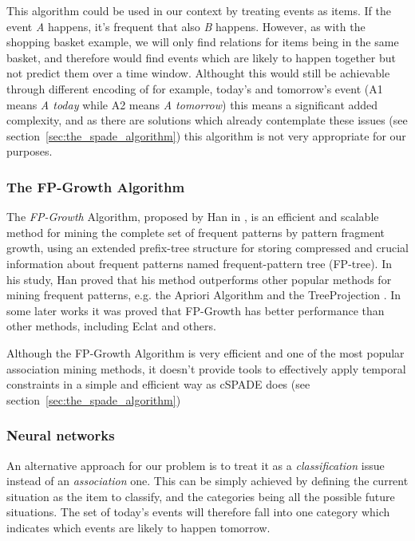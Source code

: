 This algorithm could be used in our context by treating events as items. If the event \emph{A} happens, it's frequent that also \emph{B} happens. However, as with the shopping basket example, we will only find relations for items being in the same basket, and therefore would find events which are likely to happen together but not predict them over a time window. Althought this would still be achievable through different encoding of for example, today's and tomorrow's event (A1 means \emph{A today} while A2 means \emph{A tomorrow}) this means a significant added complexity, and as there are solutions which already contemplate these issues (see section~\ref{sec:the_spade_algorithm}) this algorithm is not very appropriate for our purposes.

\subsubsection{The FP-Growth Algorithm}
The \emph{FP-Growth} Algorithm, proposed by Han in \cite{han2000mining}, is an efficient and scalable method for mining the complete set of frequent patterns by pattern fragment growth, using an extended prefix-tree structure for storing compressed and crucial information about frequent patterns named frequent-pattern tree (FP-tree). In his study, Han proved that his method outperforms other popular methods for mining frequent patterns, e.g. the Apriori Algorithm \cite{agrawal1994fast} and the TreeProjection \cite{agarwal2001tree}. In some later works \cite{kumar2010implementation} it was proved that FP-Growth has better performance than other methods, including Eclat \cite{zaki1997new} and others.

Although the FP-Growth Algorithm is very efficient and one of the most popular association mining methods, it doesn't provide tools to effectively apply temporal constraints in a simple and efficient way as cSPADE does (see section~\ref{sec:the_spade_algorithm})

\subsubsection{Neural networks}
An alternative approach for our problem is to treat it as a \emph{classification} issue instead of an \emph{association} one. This can be simply achieved by defining the current situation as the item to classify, and the categories being all the possible future situations. The set of today's events will therefore fall into one category which indicates which events are likely to happen tomorrow.

